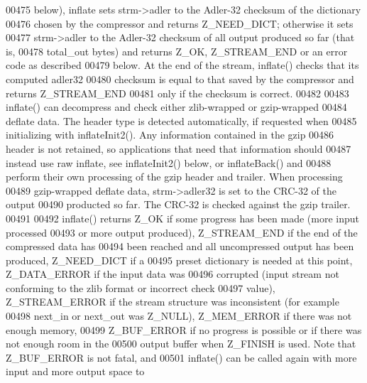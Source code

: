 \begin{DoxyCode}
00475 \textcolor{comment}{  below), inflate sets strm->adler to the Adler-32 checksum of the dictionary}
00476 \textcolor{comment}{  chosen by the compressor and returns Z\_NEED\_DICT; otherwise it sets}
00477 \textcolor{comment}{  strm->adler to the Adler-32 checksum of all output produced so far (that is,}
00478 \textcolor{comment}{  total\_out bytes) and returns Z\_OK, Z\_STREAM\_END or an error code as described}
00479 \textcolor{comment}{  below.  At the end of the stream, inflate() checks that its computed adler32}
00480 \textcolor{comment}{  checksum is equal to that saved by the compressor and returns Z\_STREAM\_END}
00481 \textcolor{comment}{  only if the checksum is correct.}
00482 \textcolor{comment}{}
00483 \textcolor{comment}{    inflate() can decompress and check either zlib-wrapped or gzip-wrapped}
00484 \textcolor{comment}{  deflate data.  The header type is detected automatically, if requested when}
00485 \textcolor{comment}{  initializing with inflateInit2().  Any information contained in the gzip}
00486 \textcolor{comment}{  header is not retained, so applications that need that information should}
00487 \textcolor{comment}{  instead use raw inflate, see inflateInit2() below, or inflateBack() and}
00488 \textcolor{comment}{  perform their own processing of the gzip header and trailer.  When processing}
00489 \textcolor{comment}{  gzip-wrapped deflate data, strm->adler32 is set to the CRC-32 of the output}
00490 \textcolor{comment}{  producted so far.  The CRC-32 is checked against the gzip trailer.}
00491 \textcolor{comment}{}
00492 \textcolor{comment}{    inflate() returns Z\_OK if some progress has been made (more input processed}
00493 \textcolor{comment}{  or more output produced), Z\_STREAM\_END if the end of the compressed data has}
00494 \textcolor{comment}{  been reached and all uncompressed output has been produced, Z\_NEED\_DICT if a}
00495 \textcolor{comment}{  preset dictionary is needed at this point, Z\_DATA\_ERROR if the input data was}
00496 \textcolor{comment}{  corrupted (input stream not conforming to the zlib format or incorrect check}
00497 \textcolor{comment}{  value), Z\_STREAM\_ERROR if the stream structure was inconsistent (for example}
00498 \textcolor{comment}{  next\_in or next\_out was Z\_NULL), Z\_MEM\_ERROR if there was not enough memory,}
00499 \textcolor{comment}{  Z\_BUF\_ERROR if no progress is possible or if there was not enough room in the}
00500 \textcolor{comment}{  output buffer when Z\_FINISH is used.  Note that Z\_BUF\_ERROR is not fatal, and}
00501 \textcolor{comment}{  inflate() can be called again with more input and more output space to}

\end{DoxyCode}
